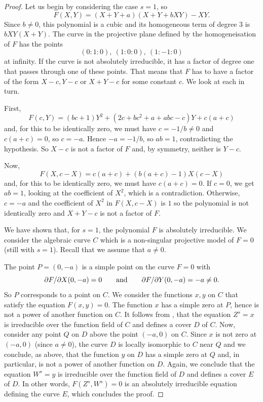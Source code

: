 \documentclass[12pt]{amsart}
\begin{document}
\begin{proof} 
Let us begin by considering the case $s=1$, so 
$$F(X,Y) = ( X + Y +a) ( X + Y + bX Y) -  X Y.$$ 
Since $b \ne 0$, this 
polynomial is a cubic and its homogeneous term of degree $3$ is $bXY(X+Y)$. The curve in the projective plane 
defined by the homogeneisation of $F$ has the points
$$(0:1:0), \ (1:0:0), \ (1:-1:0)$$ 
at infinity. If the curve is not absolutely irreducible,
it has a factor of degree one that passes through one of these points. That means that $F$ has to have a factor of the
form $X-c,Y-c$ or $X+Y-c$ for some constant $c$. We look at each in turn.

First, 
$$F(c,Y) = (bc+1)Y^2 + (2c+bc^2+a+abc-c)Y + c(a+c)$$
and, for this to be identically zero, we must have $c=-1/b \ne 0$
and $c(a+c)=0$, so $c=-a$. Hence $-a=-1/b$, so $ab=1$, contradicting the hypothesis. So $X-c$ is not a factor of $F$ 
and, by symmetry, neither is $Y-c$.

Now,
$$F(X,c-X) =  c(a+c) + (b(a+c)-1)X(c-X)$$
and, for this to be identically zero, we must have $c(a+c) = 0$. If $c=0$, we get $ab = 1$, looking at the coefficient of $X^2$, 
which is a contradiction. 
Otherwise, $c=-a$ and the coefficient of $X^2$ in $F(X,c-X)$ is $1$ so the polynomial is not identically zero
and $X+Y-c$ is not a factor of $F$.

We have shown that, for $s=1$, the polynomial $F$ is absolutely irreducible. We consider the algebraic curve $C$
which is a non-singular projective model of $F=0$ (still with $s=1$). Recall that we assume that $a \ne 0$.

The point $P=(0,-a)$ is a simple point on the curve $F=0$ with 
$$\partial F/\partial X (0,-a) = 0 \qquad\mbox{and}\qquad \partial F/\partial Y (0,-a) = -a \ne 0.$$
So $P$ corresponds to a point on $C$. We consider the functions $x,y$ on $C$ that satisfy the equation $F(x,y)=0$. The function $x$ has a simple zero at $P$, hence is not a power of another function on $C$.
It follows from \cite[Proposition 3.7.3]{Stichtenoth}, that the equation $Z^s = x$ is irreducible over the function field of $C$
and defines a cover $D$ of $C$. Now, consider any point $Q$ on $D$ above the point $(-a,0)$ on $C$. Since $x$ is not zero at $(-a,0)$ (since $a\ne 0$),
the curve $D$ is locally isomorphic to $C$ near $Q$ and we conclude, as above, that the function $y$ on $D$ has a simple zero at $Q$
and, in particular, is not a power of another function on $D$. Again, we conclude that 
the equation $W^s = y$ is irreducible over the function field of $D$ and defines a cover $E$ of $D$. 
In other words, $F(Z^s,W^s)=0$ is an absolutely irreducible equation defining the curve $E$, 
which concludes the proof.  \end{proof}
\end{document}
